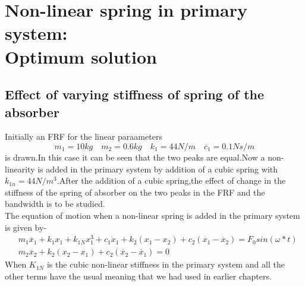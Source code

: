 \section{Non-linear spring in primary system:\\ Optimum solution}
\subsection{Effect of varying stiffness of spring of the absorber } 
Initially an FRF for the linear paraameters $$ m_1=10 kg\quad m_2=0.6kg\quad k_1=44 N/m\quad c_1=0.1 Ns/m $$ is drawn.In this case it can be seen that the two peaks are equal.Now a non-linearity is added in the primary system by addition of a cubic spring with $k_{1n}=44 N/m^3$.After the addition of a cubic spring,the effect of change in the stiffness of the spring of absorber on the two peaks in the FRF and the bandwidth is to be studied.\\
 The equation of motion when a non-linear spring is added in the primary system is given by-
  \begin{align}
&m_1\ddot{x_1}+k_1x_1+k_{1N}x_1^3+c_1 \dot x_1 + k_2(x_1-x_2)+c_2(\dot{x_1}-\dot{x_2})=F_0sin(\omega *t) \\
&m_2\ddot{x_2}+k_2(x_2-x_1)+c_{2}(\dot{x_{2}}-\dot{x_{1}})=0
\end{align}
When $K_{1N}$ is the cubic non-linear stiffness in the primary system and all the other terms have the usual meaning that we had used in earlier chapters.\\

